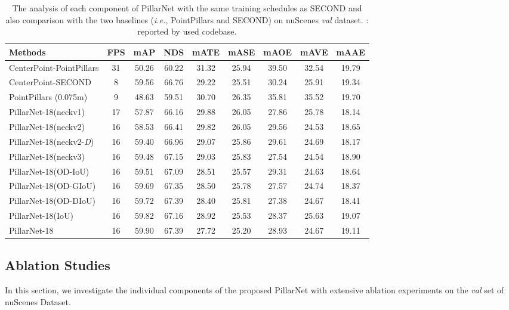 \documentclass[runningheads]{llncs}
\begin{document}
\begin{table}[t]
\centering
\caption{The analysis of each component of PillarNet with the same training schedules as SECOND and also comparison with the two baselines (\textit{i.e.}, PointPillars and SECOND) on nuScenes \textit{val} dataset. : reported by used codebase.}
\label{tab:ab_compare}
\begin{tabular}{l|c|cc|ccccc} 
\hline\noalign{\smallskip}
Methods & FPS & mAP & NDS & mATE & mASE & mAOE & mAVE & mAAE  \\ \hline
CenterPoint-PointPillars \cite{lang2019pointpillars} & 31 & 50.26 & 60.22 & 31.32 & 25.94 & 39.50 & 32.54 & 19.79 \\
CenterPoint-SECOND \cite{yan2018second} & 8 & 59.56 & 66.76 & 29.22 & 25.51 & 30.24 & 25.91 & 19.34 \\
PointPillars (0.075m) & 9 & 48.63 & 59.51 & 30.70 & 26.35 & 35.81 & 35.52 & 19.70 \\
\noalign{\smallskip}
\hline
\noalign{\smallskip}
PillarNet-18(neckv1) & 17 & 57.87 & 66.16 & 29.88 & 26.05 & 27.86 & 25.78 & 18.14 \\
PillarNet-18(neckv2) & 16 & 58.53 & 66.41 & 29.82 & 26.05 & 29.56 & 24.53 & 18.65 \\ 
PillarNet-18(neckv2-\textit{D}) & 16 & 59.40 & 66.96 & 29.07 & 25.86 & 29.61 & 24.69 & 18.17 \\
PillarNet-18(neckv3) & 16 & 59.48 & 67.15 & 29.03 & 25.83 & 27.54 & 24.54 & 18.90 \\
\hline
PillarNet-18(OD-IoU) & 16 & 59.51 & 67.09 & 28.51 & 25.57 & 29.31 & 24.63 & 18.64  \\
PillarNet-18(OD-GIoU) & 16 & 59.69 & 67.35 & 28.50 & 25.78 & 27.57 & 24.74 & 18.37 \\
PillarNet-18(OD-DIoU) & 16 & 59.72 & 67.39 & 28.40 & 25.81 & 27.38 & 24.67 & 18.41 \\
PillarNet-18(IoU) & 16 & 59.82 & 67.16 & 28.92 & 25.53 & 28.37 & 25.63 & 19.07 \\ \hline
PillarNet-18 & 16 & 59.90 & 67.39 & 27.72 & 25.20 & 28.93 & 24.67 & 19.11 \\
\hline
\end{tabular}
\end{table}


\subsection{Ablation Studies}

In this section, we investigate the individual components of the proposed PillarNet with extensive ablation experiments on the \textit{val} set of nuScenes Dataset.
\end{document}
